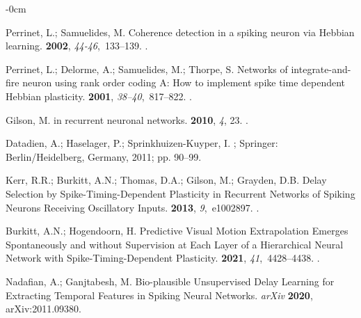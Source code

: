 \documentclass[brainsci, %
               review,accept,pdftex,moreauthors
               ]{Definitions/mdpi}
\begin{document}
\begin{adjustwidth}{-\extralength}{0cm}
\begin{thebibliography}{999}
Perrinet, L.; Samuelides, M.
\newblock Coherence detection in a spiking neuron via {Hebbian} learning.
 {\bf 2002}, {\em 44-46},~133--139.
.

Perrinet, L.; Delorme, A.; Samuelides, M.; Thorpe, S.
\newblock Networks of integrate-and-fire neuron using rank order coding {A}:
  {How} to implement spike time dependent {Hebbian} plasticity.
 {\bf 2001}, {\em 38--40},~817--822.
.

Gilson, M.
 in recurrent neuronal networks.
 {\bf 2010}, {\em 4}, 23.
.

Datadien, A.; Haselager, P.; Sprinkhuizen-Kuyper, I.
; {Springer:  Berlin/Heidelberg, Germany,} %
 2011;
\newblock pp. 90--99.

Kerr, R.R.; Burkitt, A.N.; Thomas, D.A.; Gilson, M.; Grayden, D.B.
\newblock Delay {Selection} by {Spike}-{Timing}-{Dependent} {Plasticity} in
  {Recurrent} {Networks} of {Spiking} {Neurons} {Receiving} {Oscillatory}
  {Inputs}.
 {\bf 2013}, {\em 9},~e1002897.
.

Burkitt, A.N.; Hogendoorn, H.
\newblock Predictive {Visual} {Motion} {Extrapolation} {Emerges}
  {Spontaneously} and without {Supervision} at {Each} {Layer} of a
  {Hierarchical} {Neural} {Network} with {Spike}-{Timing}-{Dependent}
  {Plasticity}.
 {\bf 2021}, {\em 41},~4428--4438.
.

Nadafian, A.; Ganjtabesh, M.
\newblock Bio-plausible {Unsupervised} {Delay} {Learning} for {Extracting}
  {Temporal} {Features} in {Spiking} {Neural} {Networks}. \emph{arXiv}  \textbf{2020},  	arXiv:2011.09380.


\end{thebibliography}
\end{adjustwidth}
\end{document}
